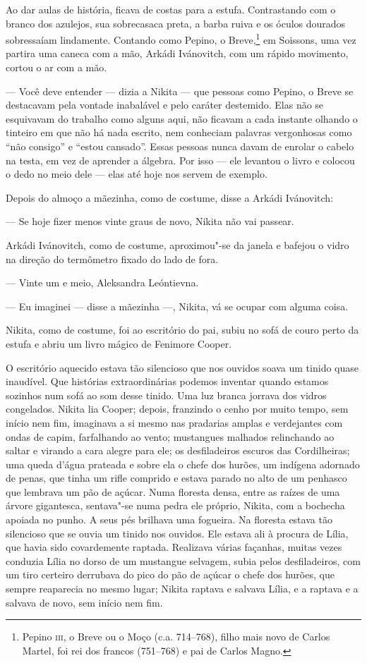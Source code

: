 Ao dar aulas de história, ficava de costas para a estufa. Contrastando
com o branco dos azulejos, sua sobrecasaca preta, a barba ruiva e os
óculos dourados sobressaíam lindamente. Contando como Pepino, o
Breve,\footnote{Pepino \textsc{iii}, o Breve ou o Moço (c.a. 714--768), filho
  mais novo de Carlos Martel, foi rei dos francos (751--768) e pai de
  Carlos Magno.} em Soissons, uma vez partira uma caneca com a mão,
Arkádi Ivánovitch, com um rápido movimento, cortou o ar com a mão.

--- Você deve entender --- dizia a Nikita --- que pessoas como Pepino, o
Breve se destacavam pela vontade inabalável e pelo caráter destemido.
Elas não se esquivavam do trabalho como alguns aqui, não ficavam a cada
instante olhando o tinteiro em que não há nada escrito, nem conheciam
palavras vergonhosas como ``não consigo'' e ``estou cansado''. Essas
pessoas nunca davam de enrolar o cabelo na testa, em vez de aprender a
álgebra. Por isso --- ele levantou o livro e colocou o dedo no meio dele
--- elas até hoje nos servem de exemplo.

Depois do almoço a mãezinha, como de costume, disse a Arkádi Ivánovitch:

--- Se hoje fizer menos vinte graus de novo, Nikita não vai passear.

Arkádi Ivánovitch, como de costume, aproximou"-se da janela e bafejou o
vidro na direção do termômetro fixado do lado de fora.

--- Vinte um e meio, Aleksandra Leóntievna.

--- Eu imaginei --- disse a mãezinha ---, Nikita, vá se ocupar com
alguma coisa.

Nikita, como de costume, foi ao escritório do pai, subiu no sofá de couro perto da estufa e abriu um livro mágico de Fenimore Cooper.

O escritório aquecido estava tão silencioso que nos ouvidos soava um
tinido quase inaudível. Que histórias extraordinárias podemos inventar
quando estamos sozinhos num sofá ao som desse tinido. Uma luz branca
jorrava dos vidros congelados. Nikita lia Cooper; depois, franzindo o
cenho por muito tempo, sem início nem fim, imaginava a si mesmo nas
pradarias amplas e verdejantes com ondas de capim, farfalhando ao vento;
mustangues malhados relinchando ao saltar e virando a cara alegre para
ele; os desfiladeiros escuros das Cordilheiras; uma queda d'água
prateada e sobre ela o chefe dos hurões, um indígena adornado de penas,
que tinha um rifle comprido e estava parado no alto de um penhasco que
lembrava um pão de açúcar. Numa floresta densa, entre as raízes de uma
árvore gigantesca, sentava"-se numa pedra ele próprio, Nikita, com a
bochecha apoiada no punho. A seus pés brilhava uma fogueira. Na floresta
estava tão silencioso que se ouvia um tinido nos ouvidos. Ele estava ali
à procura de Lília, que havia sido covardemente raptada. Realizava
várias façanhas, muitas vezes conduzia Lília no dorso de um mustangue
selvagem, subia pelos desfiladeiros, com um tiro certeiro derrubava do
pico do pão de açúcar o chefe dos hurões, que sempre reaparecia no mesmo
lugar; Nikita raptava e salvava Lília, e a raptava e a salvava de novo,
sem início nem fim.

